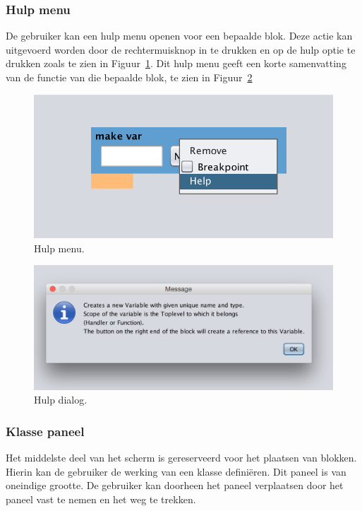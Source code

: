 \documentclass[]{article}
\begin{document}
\subsubsection{Hulp menu}
De gebruiker kan een hulp menu openen voor een bepaalde blok. Deze actie kan uitgevoerd worden door de rechtermuisknop in te drukken en op de hulp optie te drukken zoals te zien in Figuur~\ref{hulpmenu}. Dit hulp menu geeft een korte samenvatting van de functie van die bepaalde blok, te zien in Figuur~\ref{hulp}
\begin{figure}[H]
  \centering
\includegraphics[scale=0.5]{Documentatie/images/hulpmenu.png}
  \caption{Hulp menu.} \label{hulpmenu}
\end{figure}\begin{figure}[H]
  \centering
\includegraphics[scale=0.5]{Documentatie/images/hulp.png}
  \caption{Hulp dialog.} \label{hulp}
\end{figure}


\subsubsection{Klasse paneel} 
Het middelste deel van het scherm is gereserveerd voor het plaatsen van blokken. Hierin kan de gebruiker de werking van een klasse defini\"{e}ren. Dit paneel is van oneindige grootte. De gebruiker kan doorheen het paneel verplaatsen door het paneel vast te nemen en het weg te trekken.\\\\
\end{document}
